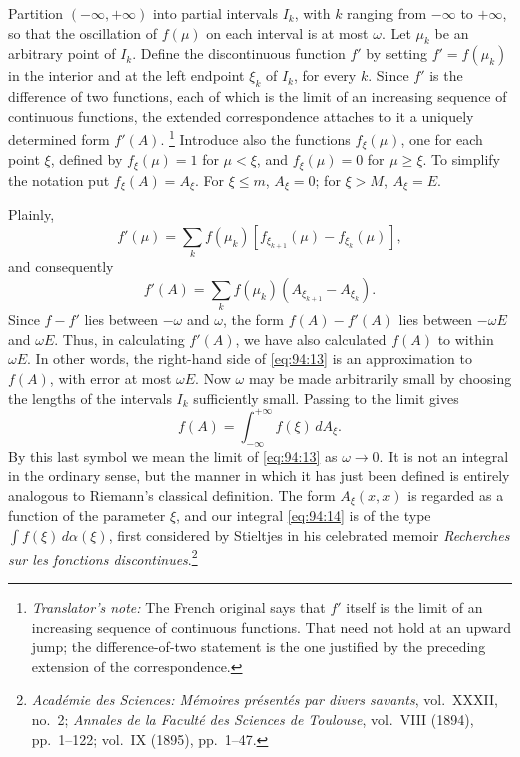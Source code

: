 \documentclass[
  paper=b5,
  fontsize=13pt,
  twoside=true,
  open=any,
  bookmarkpackage=false,
  chapterprefix=true,
  headings=normal
]{scrbook}
\theoremstyle{definition}
\newcounter{translatornote}
\newcommand{\translatornotelabel}{T\arabic{translatornote}}
\newcommand{\translatornote}[1]{%
  \stepcounter{translatornote}%
  \begingroup
    \edef\savedfootnotenumber{\number\value{footnote}}%
    \renewcommand{\thefootnote}{\translatornotelabel}%
    \footnote{\emph{Translator's note:} #1}%
    \setcounter{footnote}{\savedfootnotenumber}%
  \endgroup
}
\begin{document}
Partition \(( -\infty,+\infty)\) into partial intervals \(I_k\), with \(k\)
ranging from \(-\infty\) to \(+\infty\), so that the oscillation of \(f(\mu)\)
on each interval is at most \(\omega\).  Let \(\mu_k\) be an arbitrary point of
\(I_k\).  Define the discontinuous function \(f'\) by setting
\(f'=f(\mu_k)\) in the interior and at the left endpoint \(\xi_k\) of \(I_k\),
for every \(k\).  Since \(f'\) is the difference of two functions, each of
which is the limit of an increasing sequence of continuous functions, the
extended correspondence attaches to it a uniquely determined form
\(f'(A)\).\translatornote{The French original says that \(f'\) itself is the
limit of an increasing sequence of continuous functions.  That need not hold
at an upward jump; the difference-of-two statement is the one justified by the
preceding extension of the correspondence.}  Introduce also the functions \(f_\xi(\mu)\), one for
each point \(\xi\), defined by \(f_\xi(\mu)=1\) for \(\mu<\xi\), and
\(f_\xi(\mu)=0\) for \(\mu\ge\xi\).  To simplify the notation put
\(f_\xi(A)=A_\xi\).  For \(\xi\le m\), \(A_\xi=0\); for \(\xi>M\),
\(A_\xi=E\).

Plainly,
\[
  f'(\mu)=\sum_k f(\mu_k)
  [f_{\xi_{k+1}}(\mu)-f_{\xi_k}(\mu)],
\]
and consequently
\begin{equation}
  f'(A)=\sum_k f(\mu_k)(A_{\xi_{k+1}}-A_{\xi_k}).
  \tag{13}\label{eq:94:13}
\end{equation}
Since \(f-f'\) lies between \(-\omega\) and \(\omega\), the form
\(f(A)-f'(A)\) lies between \(-\omega E\) and \(\omega E\).  Thus, in
calculating \(f'(A)\), we have also calculated \(f(A)\) to within \(\omega E\).
In other words, the right-hand side of \eqref{eq:94:13} is an approximation to
\(f(A)\), with error at most \(\omega E\).  Now \(\omega\) may be made
arbitrarily small by choosing the lengths of the intervals \(I_k\) sufficiently
small.  Passing to the limit gives
\begin{equation}
  f(A)=\int_{-\infty}^{+\infty}f(\xi)\,dA_\xi.
  \tag{14}\label{eq:94:14}
\end{equation}
By this last symbol we mean the limit of \eqref{eq:94:13} as \(\omega\to0\).
It is not an integral in the ordinary sense, but the manner in which it has just
been defined is entirely analogous to Riemann's classical definition.  The form
\(A_\xi(x,x)\) is regarded as a function of the parameter \(\xi\), and our
integral \eqref{eq:94:14} is of the type \(\int f(\xi)\,d\alpha(\xi)\), first
considered by Stieltjes in his celebrated memoir \emph{Recherches sur les
fonctions discontinues}.\footnote{\emph{Académie des Sciences: Mémoires présentés
par divers savants}, vol.~XXXII, no.~2; \emph{Annales de la Faculté des Sciences
de Toulouse}, vol.~VIII (1894), pp.~1--122; vol.~IX (1895), pp.~1--47.}
\end{document}
